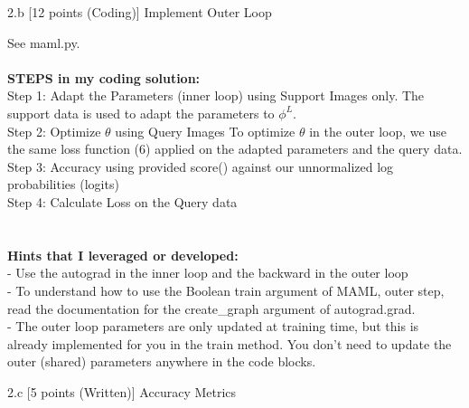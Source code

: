 

\LARGE
2.b [12 points (Coding)] Implement Outer Loop
\normalsize


\begin{answer}

    See maml.py.
    \\
    \\
    \textbf{STEPS in my coding solution:}
    \\
    Step 1: Adapt the Parameters (inner loop) using Support Images
    only. The support data is used to adapt the parameters to $\phi^L$.
    \\
    Step 2: Optimize $\theta$ using Query Images
    To optimize $\theta$ in the outer loop, we use the same loss function (6) applied on the adapted parameters and the query data.
    \\
    Step 3: Accuracy using provided score() against our unnormalized log probabilities (logits)
    \\
    Step 4: Calculate Loss on the Query data
    \\
    \\
    \\\textbf{Hints that I leveraged or developed:}
    \\
    - Use the autograd in the inner loop and the backward in the outer loop
    \\
    - To understand how to use the Boolean train argument of MAML, outer step, read the documentation for the create\_graph argument of autograd.grad.
    \\
    - The outer loop parameters are only updated at training time, but this is already implemented for you in the train method. You don’t need to update the outer (shared) parameters anywhere in the code blocks.
    \\
    

\end{answer}



\clearpage

\LARGE
2.c [5 points (Written)] Accuracy Metrics
\\
\normalsize


